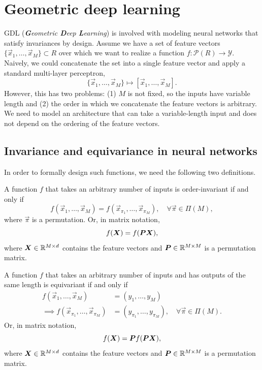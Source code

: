 \section{Geometric deep learning}

GDL (\textit{\textbf{G}eometric \textbf{D}eep \textbf{L}earning}) is involved with modeling neural
networks that satisfy invariances by design. Assume we have a set of feature vectors $\{ \vec{x}_1,
    \ldots, \vec{x}_M \} \subset R$ over which we want to realize a function $f: \mathcal{P}(R) \to
    \mathcal{Y}$. Naively, we could concatenate the set into a single feature vector and apply a
standard multi-layer perceptron, \[
    \{ \vec{x}_1, \ldots, \vec{x}_M \} \mapsto [\vec{x}_1, \ldots, \vec{x}_M].
\]
However, this has two problems: (1) $M$ is not fixed, so the inputs have variable length and (2)
the order in which we concatenate the feature vectors is arbitrary. We need to model an
architecture that can take a variable-length input and does not depend on the ordering of the
feature vectors.

\subsection{Invariance and equivariance in neural networks}

In order to formally design such functions, we need the following two definitions.

\begin{definition}
    A function $f$ that takes an arbitrary number of inputs is order-invariant if and only if \[
        f(\vec{x}_1, \ldots, \vec{x}_M) = f(\vec{x}_{\pi_1}, \ldots, \vec{x}_{\pi_M}), \quad \forall \vec{\pi} \in \Pi(M),
    \]
    where $\vec{\pi}$ is a permutation. Or, in matrix notation, \[
        f(\bm{X}) = f(\bm{P} \bm{X}),
    \]
    where $\bm{X} \in \mathbb{R}^{M\times d}$ contains the feature vectors and $\bm{P} \in \mathbb{R}^{M \times M}$
    is a permutation matrix.
\end{definition}

\begin{definition}[Equivariance]
    A function $f$ that takes an arbitrary number of inputs and has outputs of the same length is equivariant if and only if
    \begin{align*}
        f(\vec{x}_1, \ldots, \vec{x}_M)                      & = (y_1, \ldots, y_M)                                                  \\
        \implies f(\vec{x}_{\pi_1}, \ldots, \vec{x}_{\pi_M}) & = (y_{\pi_1}, \ldots, y_{\pi_M}), \quad \forall \vec{\pi} \in \Pi(M).
    \end{align*}
    Or, in matrix notation, \[
        f(\bm{X}) = \bm{P} f(\bm{P}\bm{X}),
    \]
    where $\bm{X} \in \mathbb{R}^{M\times d}$ contains the feature vectors and $\bm{P} \in \mathbb{R}^{M\times M}$ is
    a permutation matrix.
\end{definition}

